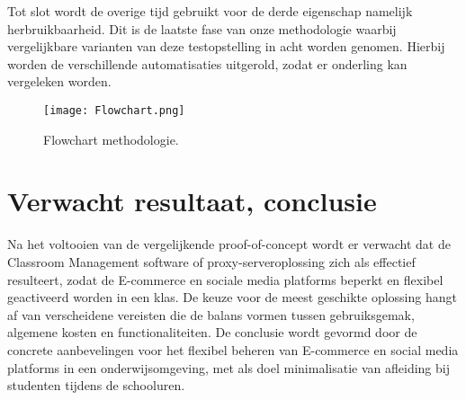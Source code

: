 Tot slot wordt de overige tijd gebruikt voor de derde eigenschap namelijk herbruikbaarheid. Dit is de laatste fase van onze methodologie waarbij vergelijkbare varianten van deze testopstelling in acht worden genomen. Hierbij worden de verschillende automatisaties uitgerold, zodat er onderling kan vergeleken worden. \newline

\begin{figure}
    \centering
    \texttt{[image: Flowchart.png]}
    \caption{Flowchart methodologie.}
    \label{fig:Flowchart}
\end{figure}
\section{Verwacht resultaat, conclusie}%
\label{sec:verwachte_resultaten}

Na het voltooien van de vergelijkende proof-of-concept wordt er verwacht dat de Classroom Management software of proxy-serveroplossing zich als effectief resulteert, zodat de E-commerce en sociale media platforms beperkt en flexibel geactiveerd worden in een klas. De keuze voor de meest geschikte oplossing hangt af van verscheidene vereisten die de balans vormen tussen gebruiksgemak, algemene kosten en functionaliteiten. De conclusie wordt gevormd door de concrete aanbevelingen voor het flexibel beheren van E-commerce en social media platforms in een onderwijsomgeving, met als doel minimalisatie van afleiding bij studenten tijdens de schooluren.